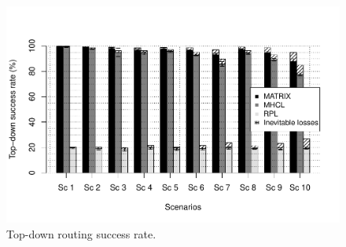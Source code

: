 \begin{figure}[h]
    \centering
    \includegraphics[width=1\linewidth]{Images/txrouting.pdf}
    \caption{Top-down routing success rate.}
    \label{fig:txdwn}
\end{figure}
